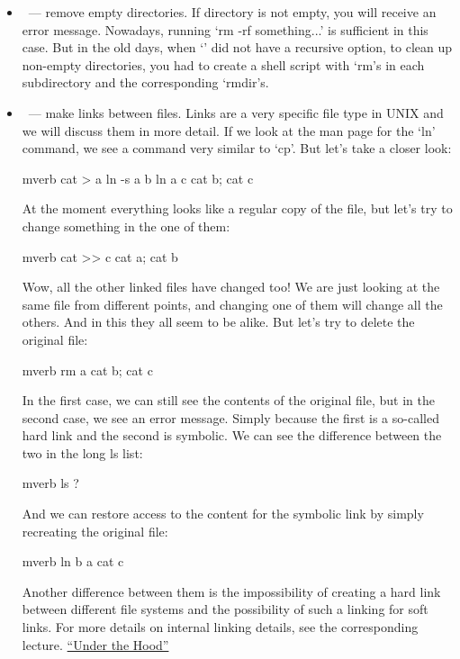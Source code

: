 \begin{itemize}
\begin{code}{mverb}
mkdir -p a/b/c
\end{code}
\item {}~--- remove empty directories. If directory is not empty,
      you will receive an error message. Nowadays, running `rm -rf something...'
      is sufficient in this case. But in the old days, when `' did not have
      a recursive option, to clean up non-empty directories, you had to create
      a shell script with `rm's in each subdirectory and the corresponding
      `rmdir's.
\item {}~--- make links between files. Links are a very specific file
      type in UNIX and we will discuss them in more detail. If we look at
      the man page for the `ln' command, we see a command very similar to `cp'.
      But let's take a closer look:
\begin{code}{mverb}
cat > a
ln -s a b
ln a c
cat b; cat c
\end{code}
At the moment everything looks like a regular copy of the file, but let's
try to change something in the one of them:
\begin{code}{mverb}
cat >> c
cat a; cat b
\end{code}
Wow, all the other linked files have changed too! We are just looking at
the same file from different points, and changing one of them will change
all the others. And in this they all seem to be alike. But let's try
to delete the original file:
\begin{code}{mverb}
rm a
cat b; cat c
\end{code}
In the first case, we can still see the contents of the original file,
but in the second case, we see an error message. Simply because the first
is a so-called hard link and the second is symbolic. We can see the
difference between the two in the long ls list:
\begin{code}{mverb}
ls ?
\end{code}
And we can restore access to the content for the symbolic link by simply
recreating the original file:
\begin{code}{mverb}
ln b a
cat c
\end{code}
Another difference between them is the impossibility of creating a hard link
between different file systems and the possibility of such a linking
for soft links. For more details on internal linking details, see
the corresponding
lecture.
\href{under_the_hood/links.md}{``Under the Hood''}%
\end{itemize}

